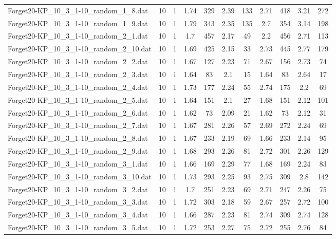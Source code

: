 \begin{table}[!ht]
\begin{tabular}{lcccccccccc}
Forget20-KP\_10\_3\_1-10\_random\_1\_8.dat & 10 & 1 & 1.74 & 329 & 2.39 & 133 & 2.71 & 418 & 3.21 & 272 \\
Forget20-KP\_10\_3\_1-10\_random\_1\_9.dat & 10 & 1 & 1.79 & 343 & 2.35 & 135 & 2.7 & 354 & 3.14 & 198 \\
Forget20-KP\_10\_3\_1-10\_random\_2\_1.dat & 10 & 1 & 1.7 & 457 & 2.17 & 49 & 2.2 & 456 & 2.71 & 113 \\
Forget20-KP\_10\_3\_1-10\_random\_2\_10.dat & 10 & 1 & 1.69 & 425 & 2.15 & 33 & 2.73 & 445 & 2.77 & 179 \\
Forget20-KP\_10\_3\_1-10\_random\_2\_2.dat & 10 & 1 & 1.67 & 127 & 2.23 & 71 & 2.67 & 156 & 2.73 & 74 \\
Forget20-KP\_10\_3\_1-10\_random\_2\_3.dat & 10 & 1 & 1.64 & 83 & 2.1 & 15 & 1.64 & 83 & 2.64 & 17 \\
Forget20-KP\_10\_3\_1-10\_random\_2\_4.dat & 10 & 1 & 1.73 & 177 & 2.24 & 55 & 2.74 & 175 & 2.2 & 69 \\
Forget20-KP\_10\_3\_1-10\_random\_2\_5.dat & 10 & 1 & 1.64 & 151 & 2.1 & 27 & 1.68 & 151 & 2.12 & 101 \\
Forget20-KP\_10\_3\_1-10\_random\_2\_6.dat & 10 & 1 & 1.62 & 73 & 2.09 & 21 & 1.62 & 73 & 2.12 & 31 \\
Forget20-KP\_10\_3\_1-10\_random\_2\_7.dat & 10 & 1 & 1.67 & 281 & 2.26 & 57 & 2.69 & 272 & 2.24 & 69 \\
Forget20-KP\_10\_3\_1-10\_random\_2\_8.dat & 10 & 1 & 1.67 & 233 & 2.19 & 69 & 1.66 & 233 & 2.14 & 95 \\
Forget20-KP\_10\_3\_1-10\_random\_2\_9.dat & 10 & 1 & 1.68 & 293 & 2.26 & 81 & 2.72 & 301 & 2.26 & 129 \\
Forget20-KP\_10\_3\_1-10\_random\_3\_1.dat & 10 & 1 & 1.66 & 169 & 2.29 & 77 & 1.68 & 169 & 2.24 & 83 \\
Forget20-KP\_10\_3\_1-10\_random\_3\_10.dat & 10 & 1 & 1.73 & 293 & 2.25 & 93 & 2.75 & 309 & 2.8 & 142 \\
Forget20-KP\_10\_3\_1-10\_random\_3\_2.dat & 10 & 1 & 1.7 & 251 & 2.23 & 69 & 2.71 & 247 & 2.26 & 75 \\
Forget20-KP\_10\_3\_1-10\_random\_3\_3.dat & 10 & 1 & 1.72 & 303 & 2.18 & 59 & 2.67 & 257 & 2.72 & 100 \\
Forget20-KP\_10\_3\_1-10\_random\_3\_4.dat & 10 & 1 & 1.66 & 287 & 2.23 & 81 & 2.74 & 309 & 2.74 & 128 \\
Forget20-KP\_10\_3\_1-10\_random\_3\_5.dat & 10 & 1 & 1.72 & 253 & 2.27 & 75 & 2.72 & 255 & 2.76 & 84 \\

\end{tabular}
\end{table}
